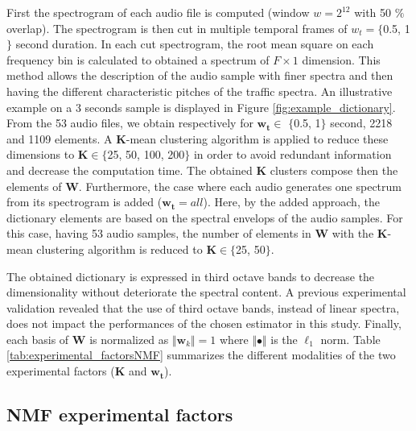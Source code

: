 \documentclass[review,5p,twocolumn,sort&compress,times]{elsarticle}
\begin{document}
First the spectrogram of each audio file is computed (window $w = 2^{12}$ with 50 $\%$ overlap). The spectrogram is then cut in multiple temporal frames of $w_t  = \lbrace$0.5, 1$\rbrace$ second duration. In each cut spectrogram, the root mean square on each frequency bin is calculated to obtained a spectrum of $F \times 1$ dimension. This method allows the description of the audio sample with finer spectra and then having the different characteristic pitches of the traffic spectra. An illustrative example on a 3 seconds sample is displayed in Figure \ref{fig:example_dictionary}. From the 53 audio files, we obtain respectively for $\mathbf{w_t}\in$ $\lbrace$0.5, 1$\rbrace$ second, 2218 and 1109 elements. A $\mathbf{K}$-mean clustering algorithm is applied to reduce these dimensions to $\mathbf{K} \in \lbrace$25, 50, 100, 200$\rbrace$ in order to avoid redundant information and decrease the computation time. The obtained $\mathbf{K}$ clusters compose then the elements of $\mathbf{W}$. Furthermore, the case where each audio generates one spectrum from its spectrogram is added ($\mathbf{w_t} = all$). Here, by the added approach, the dictionary elements are based on the spectral envelops of the audio samples. For this case, having 53 audio samples, the number of elements in $\mathbf{W}$ with the $\mathbf{K}$-mean clustering algorithm is reduced to $\mathbf{K} \in \lbrace$25, 50$\rbrace$.

The obtained dictionary is expressed in third octave bands to decrease the dimensionality without deteriorate the spectral content. A previous experimental validation revealed that the use of third octave bands, instead of linear spectra, does not impact the performances of the chosen estimator in this study.  Finally, each basis of $\mathbf{W}$ is normalized as $ \Vert \mathbf{w}_k \Vert = 1$ where $\Vert \bullet \Vert$ is the $\ell_1$ norm. Table \ref{tab:experimental_factorsNMF} summarizes the different modalities of the two experimental factors ($\mathbf{K}$ and $\mathbf{w_t}$). 

\subsection{NMF experimental factors}
\end{document}
